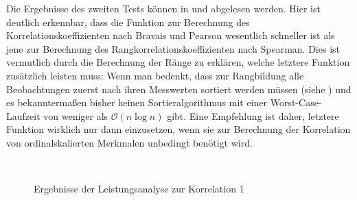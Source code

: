 Die Ergebnisse des zweiten Tests können in  und  abgelesen werden. Hier ist deutlich erkennbar, dass die Funktion zur Berechnung des Korrelationskoeffizienten nach Bravais und Pearson wesentlich schneller ist als jene zur Berechnung des Rangkorrelationskoeffizienten nach Spearman. Dies ist vermutlich durch die Berechnung der Ränge zu erklären, welche letztere Funktion zusätzlich leisten muss: Wenn man bedenkt, dass zur Rangbildung alle Beobachtungen zuerst nach ihren Messwerten sortiert werden müssen (siehe ) und es bekanntermaßen bisher keinen Sortieralgorithmus mit einer Worst-Case-Laufzeit von weniger als $\mathcal{O}(n \log{n})$ gibt. Eine Empfehlung ist daher, letztere Funktion wirklich nur dann einzusetzen, wenn sie zur Berechnung der Korrelation von ordinalskalierten Merkmalen unbedingt benötigt wird.

\begin{figure}[H]
  \centering
  \begin{narrow}{-0.2\textwidth}{0.2\textwidth}
    \\
  \end{narrow}
  \caption{Ergebnisse der Leistungsanalyse zur Korrelation 1}
  \label{fig:analysis:correlation1}
\end{figure}

